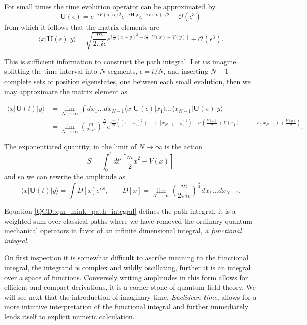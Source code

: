 For small times the time evolution operator can be approximated by 
\begin{equation*}
\mathbf{U}(\epsilon) = e^{-iV(\mathbf{x})\epsilon/2}e^{-i\mathbf{H_0}\epsilon}e^{-iV(\mathbf{x}) \epsilon/2} + \mathcal{O}(\epsilon^3)
\end{equation*}
from which it follows that the matrix elements are 
\begin{equation*}
\langle x | \mathbf{U}(\epsilon) | y \rangle = \sqrt{\frac{m}{2\pi i\epsilon}}e^{i \frac{m}{2\epsilon}(x-y)^2 -i \frac{\epsilon}{2}\left[ V(x) + V(y) \right]}  + \mathcal{O}(\epsilon^3).
\end{equation*}

This is sufficient information to construct the path integral. Let us imagine splitting the time interval into $N$ segments, $\epsilon = t/N$, and inserting $N-1$ complete sets of position eigenstates, one between each small evolution, then we may approximate the matrix element as 

\begin{align*}
\langle x | \mathbf{U}(t) | y \rangle &= \lim_{N\to \infty} \int dx_1 \ldots dx_{N-1} \langle x | \mathbf{U}(\epsilon) | x_1 \rangle \ldots \langle x_{N-1} | \mathbf{U}(\epsilon) | y \rangle  \\
&= \lim_{N\to \infty}\left(\frac{m}{2\pi i\epsilon}\right)^{\frac{N}{2}}e^{ i \frac{m}{2\epsilon} \left( [x-x_1]^2 + \ldots + [x_{N-1} -y]^2 \right) -i\epsilon \left( \frac{V(x)}{2} + V(x_1) + \ldots + V(x_{N-1}) + \frac{V(y)}{2}\right)}.
\end{align*}

The exponentiated quantity, in the limit of $N \to \infty$ is the action 
\begin{equation*}
S = \int_0^t dt' \left[ \frac{m}{2} \dot{x}^2 - V(x) \right] 
\end{equation*}
and so we can rewrite the amplitude as 
\begin{equation}
\langle x | \mathbf{U}(t) | y \rangle = \int D[x] e^{iS}, \qquad D[x] = \lim_{N\to \infty}\left(\frac{m}{2\pi i\epsilon}\right)^{\frac{N}{2}} dx_1 \ldots dx_{N-1}. \label{QCD::qm_mink_path_integral}
\end{equation}

Equation \ref{QCD::qm_mink_path_integral} defines the path integral, it is a weighted sum over classical paths where we have removed the ordinary quantum mechanical operators in favor of an infinite dimensional integral, a \emph{functional integral}. 

On first inspection it is somewhat difficult to ascribe meaning to the functional integral,  the integrand is complex and wildly oscillating, further it is an integral over a space of functions. Conversely writing amplitudes in this form allows for efficient and compact derivations, it is a corner stone of quantum field theory. We will see next that the introduction of imaginary time, \emph{Euclidean time}, allows for a more intuitive interpretation of the functional integral and further immediately lends itself to explicit numeric calculation. 

